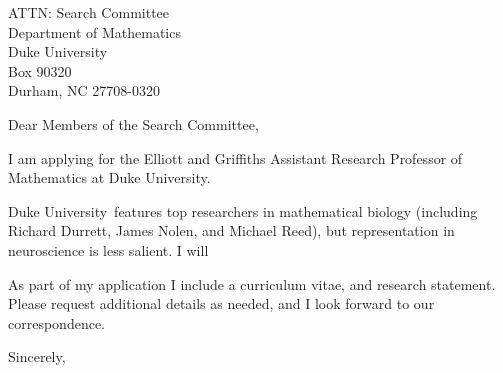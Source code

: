 \documentclass[11pt,a4paper]{letter}
\begin{document}

\def\School{Duke University}

\begin{letter}
{ATTN: Search Committee\\
Department of Mathematics\\
Duke University\\
Box 90320\\
Durham, NC 27708-0320
}


\opening{Dear Members of the Search Committee,}

I am applying for the Elliott and Griffiths Assistant Research Professor of Mathematics at \School. 



\School~features top researchers in mathematical biology (including Richard Durrett, James Nolen, and Michael Reed), but representation in neuroscience is less salient. I will 



As part of my application I include a curriculum vitae, and research statement. Please request additional details as needed, and I look forward to our correspondence.

\closing{Sincerely,}
\end{letter}
\end{document}

